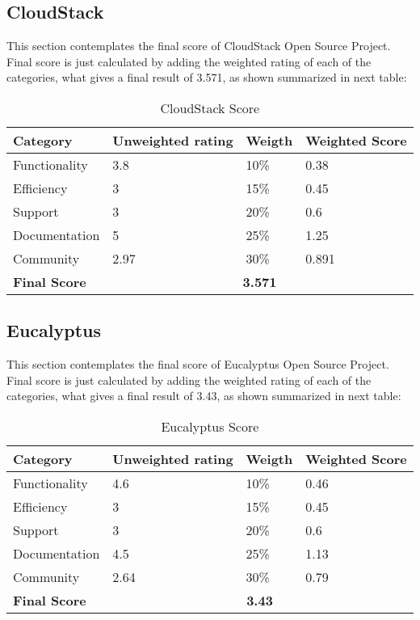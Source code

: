 \documentclass[11pt]{article}
\begin{document}
\subsection{CloudStack}
This section contemplates the final score of CloudStack Open Source Project. Final score is just calculated by adding the weighted rating of each of the categories, what gives a final result of 3.571, as shown summarized in next table:
\begin{table}[H]
  \begin{center}
    \begin{tabular}{ | p{3cm} | p{2.5cm} | p{1.5cm} | p{2cm} | }
    \toprule
    \textbf{Category} & \textbf{Unweighted rating} & \textbf{Weigth} & \textbf{Weighted Score}\\
    \hline
    Functionality & 3.8 & 10\% & 0.38\\
    \hline
    Efficiency & 3 & 15\% & 0.45\\
    \hline
    Support & 3 & 20\% & 0.6\\
    \hline
    Documentation & 5 & 25\% & 1.25\\
    \hline
    Community & 2.97 & 30\% & 0.891\\
    \midrule
    \textbf{Final Score} & \multicolumn {3}{c|}{\textbf{3.571}}\\
    \bottomrule
    \end{tabular}
    \caption{CloudStack Score}
    \label{tab:cloudstack_score}
  \end{center}
\end{table}

\subsection{Eucalyptus}
This section contemplates the final score of Eucalyptus Open Source Project. Final score is just calculated by adding the weighted rating of each of the categories, what gives a final result of 3.43, as shown summarized in next table:
\begin{table}[H]
  \begin{center}
    \begin{tabular}{ | p{3cm} | p{2.5cm} | p{1.5cm} | p{2cm} | }
    \toprule
    \textbf{Category} & \textbf{Unweighted rating} & \textbf{Weigth} & \textbf{Weighted Score}\\
    \hline
    Functionality & 4.6 & 10\% & 0.46\\
    \hline
    Efficiency & 3 & 15\% & 0.45\\
    \hline
    Support & 3 & 20\% & 0.6\\
    \hline
    Documentation & 4.5 & 25\% & 1.13\\
    \hline
    Community & 2.64 & 30\% & 0.79\\
    \midrule
    \textbf{Final Score} & \multicolumn {3}{c|}{\textbf{3.43}}\\
    \bottomrule
    \end{tabular}
    \caption{Eucalyptus Score}
    \label{tab:eucalyptus_score}
  \end{center}
\end{table}
\end{document}

